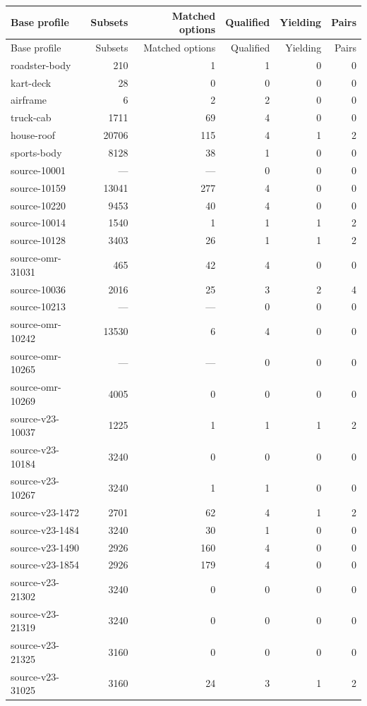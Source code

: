\begin{longtable}{p{}rrrrr}\toprule
Base profile & Subsets & Matched options & Qualified & Yielding & Pairs\\\midrule
\endfirsthead
\toprule
Base profile & Subsets & Matched options & Qualified & Yielding & Pairs\\\midrule\endhead
\midrule\endfoot
\bottomrule\endlastfoot
roadster-body & 210 & 1 & 1 & 0 & 0\\
kart-deck & 28 & 0 & 0 & 0 & 0\\
airframe & 6 & 2 & 2 & 0 & 0\\
truck-cab & 1711 & 69 & 4 & 0 & 0\\
house-roof & 20706 & 115 & 4 & 1 & 2\\
sports-body & 8128 & 38 & 1 & 0 & 0\\
source-10001 & --- & --- & 0 & 0 & 0\\
source-10159 & 13041 & 277 & 4 & 0 & 0\\
source-10220 & 9453 & 40 & 4 & 0 & 0\\
source-10014 & 1540 & 1 & 1 & 1 & 2\\
source-10128 & 3403 & 26 & 1 & 1 & 2\\
source-omr-31031 & 465 & 42 & 4 & 0 & 0\\
source-10036 & 2016 & 25 & 3 & 2 & 4\\
source-10213 & --- & --- & 0 & 0 & 0\\
source-omr-10242 & 13530 & 6 & 4 & 0 & 0\\
source-omr-10265 & --- & --- & 0 & 0 & 0\\
source-omr-10269 & 4005 & 0 & 0 & 0 & 0\\
source-v23-10037 & 1225 & 1 & 1 & 1 & 2\\
source-v23-10184 & 3240 & 0 & 0 & 0 & 0\\
source-v23-10267 & 3240 & 1 & 1 & 0 & 0\\
source-v23-1472 & 2701 & 62 & 4 & 1 & 2\\
source-v23-1484 & 3240 & 30 & 1 & 0 & 0\\
source-v23-1490 & 2926 & 160 & 4 & 0 & 0\\
source-v23-1854 & 2926 & 179 & 4 & 0 & 0\\
source-v23-21302 & 3240 & 0 & 0 & 0 & 0\\
source-v23-21319 & 3240 & 0 & 0 & 0 & 0\\
source-v23-21325 & 3160 & 0 & 0 & 0 & 0\\
source-v23-31025 & 3160 & 24 & 3 & 1 & 2\\

\end{longtable}
